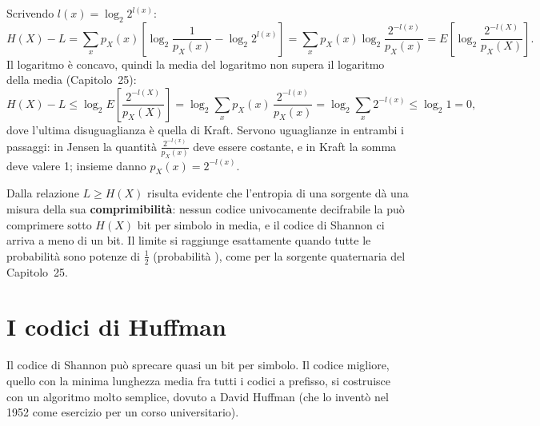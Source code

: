 \begin{dimostrazione}
 Scrivendo $l(x) = \log_2 2^{l(x)}$:
\[ H(X) - L = \sum_x p_X(x) \left[ \log_2 \frac{1}{p_X(x)} - \log_2 2^{l(x)} \right] = \sum_x p_X(x) \log_2
   \frac{2^{-l(x)}}{p_X(x)} = E\left[ \log_2 \frac{2^{-l(X)}}{p_X(X)} \right] . \]
 Il logaritmo è concavo, quindi la media del logaritmo non supera il logaritmo della media (Capitolo~25):
\[ H(X) - L \leq \log_2 E\left[ \frac{2^{-l(X)}}{p_X(X)} \right] = \log_2 \sum_x p_X(x)\, \frac{2^{-l(x)}}{p_X(x)} =
   \log_2 \sum_x 2^{-l(x)} \leq \log_2 1 = 0 , \]
dove l'ultima disuguaglianza è quella di Kraft.
 Servono uguaglianze in entrambi i passaggi: in Jensen la quantità $\frac{2^{-l(x)}}{p_X(x)}$ deve
essere costante, e in Kraft la somma deve valere 1; insieme danno $p_X(x) = 2^{-l(x)}$.
\end{dimostrazione}

Dalla relazione $L \geq H(X)$ risulta evidente che l'entropia di una sorgente dà una misura della sua
\textbf{comprimibilità}: nessun codice univocamente decifrabile la può comprimere sotto $H(X)$ bit per simbolo in media,
e il codice di Shannon ci arriva a meno di un bit. Il limite si raggiunge esattamente quando tutte le probabilità sono
potenze di $\frac12$ (probabilità ), come per la sorgente quaternaria del Capitolo~25.

\section{I codici di Huffman}

Il codice di Shannon può sprecare quasi un bit per simbolo. Il codice migliore, quello con la minima lunghezza media fra
tutti i codici a prefisso, si costruisce con un algoritmo molto semplice, dovuto a David Huffman (che lo inventò nel
1952 come esercizio per un corso universitario).


